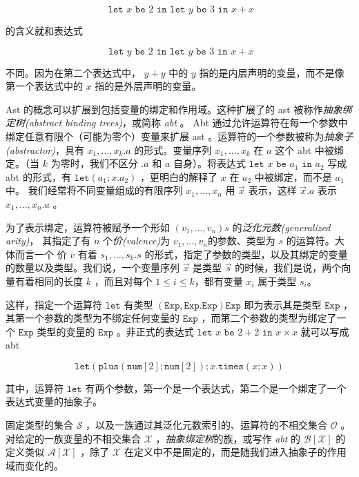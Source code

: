 \[\texttt{ let } x \texttt{ be } 2 \texttt{ in} \texttt{ let } y \texttt{ be } 3 \texttt{ in } x+x\]

的含义就和表达式

\[\texttt{ let } y \texttt{ be } 2 \texttt{ in} \texttt{ let } y \texttt{ be } 3 \texttt{ in } x+x\]

不同。因为在第二个表达式中， \(y+y\) 中的 \(y\)
指的是内层声明的变量，而不是像第一个表达式中的 \(x\)
指的是外层声明的变量。

Ast 的概念可以扩展到包括变量的绑定和作用域。这种扩展了的 ast
被称作\emph{抽象绑定树(abstract binding trees)}，或简称 \emph{abt} 。
Abt 通过允许运算符在每一个参数中绑定任意有限个（可能为零个）变量来扩展
ast 。运算符的一个参数被称为\emph{抽象子(abstractor)}，具有
\(x_1,\dots,x_k.a\) 的形式。变量序列 \(x_1,\dots ,x_k\) 在 \(a\) 这个
abt 中被绑定。（当 \(k\) 为零时，我们不区分 \(.a\) 和 \(a\)
自身）。将表达式 \(\texttt{let } x\texttt{ be } a_1 \texttt{ in } a_2\)
写成 abt 的形式，有 \(\texttt{let}(a_1;x.a_2)\) ，更明白的解释了 \(x\)
在 \(a_2\) 中被绑定，而不是 \(a_1\) 中。
我们经常将不同变量组成的有限序列 \(x_1, \dots , x_n\) 用 \(\vec{x}\)
表示，这样 \(\vec{x}.a\) 表示 \(x_1,\dots,x_n.a\) 。

为了表示绑定，运算符被赋予一个形如 \((v_1,\dots,v_n)s\)
的\emph{泛化元数(generalized arity)}， 其指定了有 \(n\)
个\emph{价(valence)}为 \(v_1,\dots,v_n\)的参数、类型为 \(s\)
的运算符。大体而言一个 价 \(v\) 有着 \(s_1,\dots,s_k.s\)
的形式，指定了参数的类型，以及其绑定的变量的数量以及类型。我们说，一个变量序列
\(\vec{x}\) 是类型 \(\vec{s}\) 的时候，我们是说，两个向量有着相同的长度
\(k\) ，而且对每个 \(1\leq i\leq k\)，都有变量 \(x_i\) 属于类型
\(s_i\)。

这样，指定一个运算符 \(\texttt{let}\) 有类型
\((\texttt{Exp}, \texttt{Exp.Exp})\texttt{Exp}\) 即为表示其是类型
\(\texttt{Exp}\) ，其第一个参数的类型为不绑定任何变量的 \(\texttt{Exp}\)
，而第二个参数的类型为绑定了一个 \(\texttt{Exp}\) 类型的变量的
\(\texttt{Exp}\) 。非正式的表达式
\(\texttt{let } x\texttt{ be } 2+2 \texttt{ in } x\times x\) 就可以写成
abt

\[\texttt{let}(\texttt{plus}(\texttt{num}[2];\texttt{num}[2]);x.\texttt{times}(x;x))\]

其中，运算符 \(\texttt{let}\)
有两个参数，第一个是一个表达式，第二个是一个绑定了一个表达式变量的抽象子。

固定类型的集合 \(\mathcal{S}\)
，以及一族通过其泛化元数索引的、运算符的不相交集合 \(\mathcal{O}\)
。对给定的一族变量的不相交集合 \(\mathcal{X}\)
，\emph{抽象绑定树}的族，或写作 \emph{abt} 的 \(\mathcal{B[X]}\)
的定义类似 \(\mathcal{A[X]}\) ，除了 \(\mathcal{X}\)
在定义中不是固定的，而是随我们进入抽象子的作用域而变化的。

